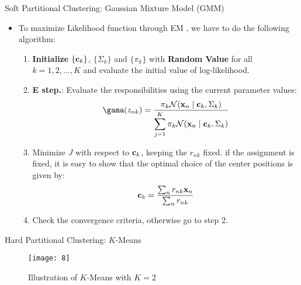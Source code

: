 \documentclass[compress,oilve]{beamer}
\begin{document}
\begin{frame}{Soft Partitional Clustering: Gaussian Mixture Model (GMM)}
\begin{itemize}
\item To maximize Likelihood function through EM , we have to do the following algorithm:
	\begin{enumerate}
		\item \textbf{Initialize} $ \{\mathbf{c_{\mathnormal k}} \}$, $\{\Sigma_{k}\}$ and $\{ \pi_{k}\}$ with \textbf{Random Value} for all $ k = 1, 2, \dots, K$ and evaluate the initial value of log-likelihood.
		\item \textbf{E step.}: Evaluate the responsibilities using the current parameter values:
				$$ \gama(z_{nk}) = \frac{\pi_{k} \mathcal{N}(\mathbf{x_{\mathnormal n}} \mid \mathbf{c_{\mathnormal k}}, \Sigma_{k})}{\displaystyle\sum_{j=1}^{K} \pi_{k} \mathcal{N}(\mathbf{x_{\mathnormal n}} \mid \mathbf{c_{\mathnormal k}}, \Sigma_{k})}$$
		\item Minimize $ J $ with respect to $ \mathbf{c_{\mathnormal k}} $, keeping the $ r_{nk} $ fixed. if the assignment is fixed, it is easy to show that the optimal choice of the center positions is given by:
			$$ \mathbf{c_{\mathnormal k}} =  \frac{\sum_{n} r_{nk}\mathbf x_{\mathnormal n}}{\sum_{n} r_{nk}}$$
		\item Check the convergence criteria, otherwise go to step 2.	
	\end{enumerate}
\end{itemize}
\end{frame}

\begin{frame}{Hard Partitional Clustering: $K$-Means}
\begin{figure}
	\centering
	\texttt{[image: 8]}
	\caption{Illustration of $K$-Means with $K = 2$}
\end{figure}
\end{frame}
\end{document}
